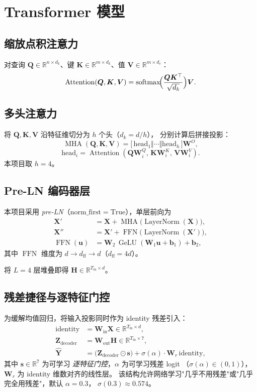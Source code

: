 \documentclass[11pt,a4paper]{article}
\newcommand{\R}{\mathbb{R}}
\DeclareMathOperator{\softmax}{softmax}
\DeclareMathOperator{\LayerNorm}{LayerNorm}
\DeclareMathOperator{\FFN}{FFN}
\DeclareMathOperator{\MHA}{MHA}
\DeclareMathOperator{\GeLU}{GeLU}
\DeclareMathOperator{\Attention}{Attention}
\newcommand{\mat}[1]{\bm{#1}}
\newcommand{\vect}[1]{\bm{#1}}
\begin{document}
\section{Transformer 模型}

\subsection{缩放点积注意力}
对查询 $\mat{Q}\in\R^{n \times d_k}$、键 $\mat{K}\in\R^{m \times d_k}$、值 $\mat{V}\in\R^{m \times d_v}$：
\[
\Attention(\mat{Q},\mat{K},\mat{V})
=
\softmax\!\Bigl(\frac{\mat{Q}\mat{K}^{\top}}{\sqrt{d_k}}\Bigr)\mat{V}.
\]

\subsection{多头注意力}
将 $\mat{Q},\mat{K},\mat{V}$ 沿特征维切分为 $h$ 个头（$d_k = d/h$），
分别计算后拼接投影：
\[
\MHA(\mat{Q},\mat{K},\mat{V}) = \bigl[\,\mathrm{head}_1 \Vert \cdots \Vert \mathrm{head}_h\,\bigr]\mat{W}^{O},
\]
\[
\mathrm{head}_i = \Attention(\mat{Q}\mat{W}_i^{Q},\,\mat{K}\mat{W}_i^{K},\,\mat{V}\mat{W}_i^{V}).
\]
本项目取 $h=4$。

\subsection{Pre-LN 编码器层}
本项目采用 \emph{pre-LN}（$\mathrm{norm\_first = True}$），单层前向为
\begin{align}
\mat{X}' &= \mat{X} + \MHA\!\bigl(\LayerNorm(\mat{X})\bigr),\\
\mat{X}'' &= \mat{X}' + \FFN\!\bigl(\LayerNorm(\mat{X}')\bigr),\\
\FFN(\mat{u}) &= \mat{W}_2\,\GeLU(\mat{W}_1 \mat{u} + \vect{b}_1) + \vect{b}_2,
\end{align}
其中 $\FFN$ 维度为 $d \to d_{\text{ff}} \to d$（$d_{\text{ff}} = 4d$）。

将 $L = 4$ 层堆叠即得 $\mat{H} \in \R^{T_{\text{in}} \times d}$。

\subsection{残差捷径与逐特征门控}
为缓解均值回归，将输入投影同时作为 identity 残差引入：
\begin{align}
\mathrm{identity} &= \mat{W}_{\text{in}}\mat{X} \in \R^{T_{\text{in}} \times d},\\
\mat{Z}_{\text{decoder}} &= \mat{W}_{\text{out}}\mat{H} \in \R^{T_{\text{in}} \times 7},\\
\widehat{\mat{Y}} &= \bigl(\mat{Z}_{\text{decoder}} \odot \vect{s}\bigr) + \sigma(\alpha)\cdot \mat{W}_{r}\,\mathrm{identity},
\end{align}
其中 $\vect{s} \in \R^7$ 为可学习 \emph{逐特征门控}，$\alpha$ 为可学习残差 logit
（$\sigma(\alpha) \in (0,1)$），$\mat{W}_r$ 为 identity 维数对齐的线性层。
该结构允许网络学习"几乎不用残差"或"几乎完全用残差"，默认 $\alpha = 0.3$，
$\sigma(0.3) \approx 0.574$。
\end{document}
